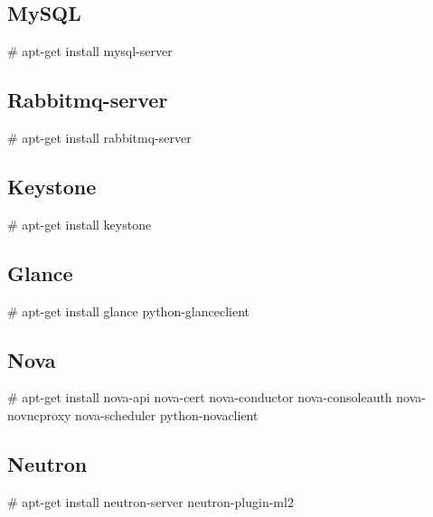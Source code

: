 \documentclass[12pt]{report}
\begin{document}
\subsection{MySQL}
\# apt-get install mysql-server
\subsection{Rabbitmq-server}
\# apt-get install rabbitmq-server
\subsection{Keystone}
\# apt-get install keystone
\subsection{Glance}
\# apt-get install glance python-glanceclient
\subsection{Nova}
\# apt-get install nova-api nova-cert nova-conductor nova-consoleauth nova-novncproxy nova-scheduler python-novaclient
\subsection{Neutron}
\# apt-get install neutron-server neutron-plugin-ml2
\pagebreak
\end{document}
